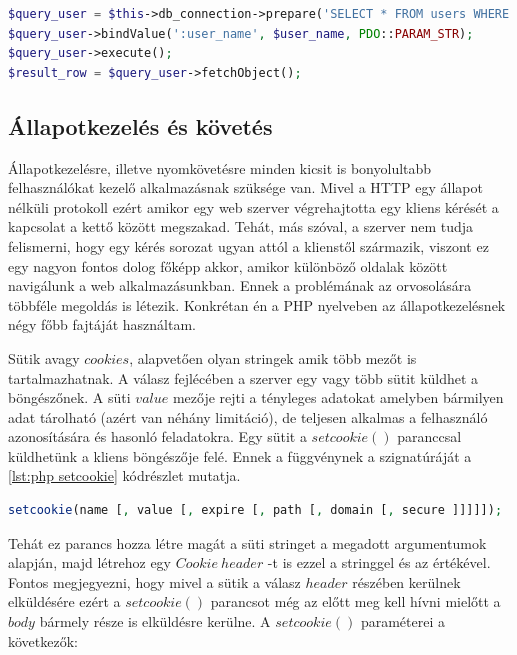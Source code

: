 \documentclass[12pt]{report}
\theoremstyle{definition}
\begin{document}
	\noindent\begin{minipage}{\linewidth}
		\begin{lstlisting}[language=php,label={lst:php pdo sql query}, caption={PHP PDO SQL lekérdezés}]
$query_user = $this->db_connection->prepare('SELECT * FROM users WHERE user_name = :user_name');
$query_user->bindValue(':user_name', $user_name, PDO::PARAM_STR);
$query_user->execute();
$result_row = $query_user->fetchObject();
		\end{lstlisting}
	\end{minipage}
	
	\subsection{Állapotkezelés és követés}
	Állapotkezelésre, illetve nyomkövetésre minden kicsit is bonyolultabb felhasználókat kezelő alkalmazásnak szüksége van. Mivel a HTTP egy állapot nélküli protokoll ezért amikor egy web szerver végrehajtotta egy kliens kérését a kapcsolat a kettő között megszakad. Tehát, más szóval, a szerver nem tudja felismerni, hogy egy kérés sorozat ugyan attól a klienstől származik, viszont ez egy nagyon fontos dolog főképp akkor, amikor különböző oldalak között navigálunk a web alkalmazásunkban. Ennek a problémának az orvosolására többféle megoldás is létezik. Konkrétan én a PHP nyelveben az állapotkezelésnek négy főbb fajtáját használtam. 
	
	Sütik avagy $cookies$, alapvetően olyan stringek amik több mezőt is tartalmazhatnak. A válasz fejlécében a szerver egy vagy több sütit küldhet a böngészőnek. A süti $value$ mezője rejti a tényleges adatokat amelyben bármilyen adat tárolható (azért van néhány limitáció), de teljesen alkalmas a felhasználó azonosítására és hasonló feladatokra. Egy sütit a $setcookie\left(\right)$ paranccsal küldhetünk a kliens böngészője felé. Ennek a függvénynek a szignatúráját a \ref{lst:php setcookie} kódrészlet mutatja.
	
	\noindent\begin{minipage}{\linewidth}
		\begin{lstlisting}[language=php,label={lst:php setcookie}, caption={PHP setcookie függvény}]
setcookie(name [, value [, expire [, path [, domain [, secure ]]]]]);
		\end{lstlisting}
	\end{minipage}
	
	Tehát ez parancs hozza létre magát a süti stringet a megadott argumentumok alapján, majd létrehoz egy $Cookie\ header$ -t is ezzel a stringgel és az értékével. Fontos megjegyezni, hogy mivel a sütik a válasz $header$ részében kerülnek elküldésére ezért a  $setcookie\left(\right)$ parancsot még az előtt meg kell hívni mielőtt a $body$ bármely része is elküldésre kerülne. A $setcookie\left(\right)$ paraméterei a következők:
	
\end{document}
